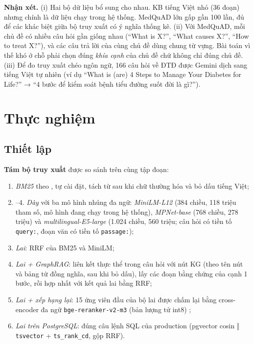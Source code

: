 
\textbf{Nhận xét.} (i) Hai bộ dữ liệu bổ sung cho nhau. KB tiếng Việt nhỏ (36 đoạn) nhưng chính là dữ liệu chạy trong hệ thống. MedQuAD lớn gấp gần 100 lần, đủ để các khác biệt giữa bộ truy xuất có ý nghĩa thống kê. (ii) Với MedQuAD, mỗi chủ đề có nhiều câu hỏi gần giống nhau (``What is X?'', ``What causes X?'', ``How to treat X?''), và các câu trả lời của cùng chủ đề dùng chung từ vựng. Bài toán vì thế khó ở chỗ phải chọn đúng \emph{khía cạnh} của chủ đề chứ không chỉ đúng chủ đề. (iii) Để đo truy xuất chéo ngôn ngữ, 166 câu hỏi về ĐTĐ được Gemini dịch sang tiếng Việt tự nhiên (ví dụ ``What is (are) 4 Steps to Manage Your Diabetes for Life?'' → ``4 bước để kiểm soát bệnh tiểu đường suốt đời là gì?'').

\section{Thực nghiệm}

\subsection{Thiết lập}

\textbf{Tám bộ truy xuất} được so sánh trên cùng tập đoạn:
\begin{enumerate}
  \item \emph{BM25} theo , tự cài đặt, tách từ sau khi chữ thường hóa và bỏ dấu tiếng Việt;
  \item–4. \emph{Dày} với ba mô hình nhúng đa ngữ: \emph{MiniLM-L12} (384 chiều, 118 triệu tham số, mô hình đang chạy trong hệ thống), \emph{MPNet-base} (768 chiều, 278 triệu) và \emph{multilingual-E5-large} \cite{wang2024e5} (1.024 chiều, 560 triệu; câu hỏi có tiền tố \texttt{query:}, đoạn văn có tiền tố \texttt{passage:});
  \setcounter{enumi}{4}
  \item \emph{Lai}: RRF  của BM25 và MiniLM;
  \item \emph{Lai + GraphRAG}: liên kết thực thể trong câu hỏi với nút KG (theo tên nút và bảng từ đồng nghĩa, sau khi bỏ dấu), lấy các đoạn bằng chứng của cạnh 1 bước, rồi hợp nhất với kết quả lai bằng RRF;
  \item \emph{Lai + xếp hạng lại}: 15 ứng viên đầu của bộ lai được chấm lại bằng cross-encoder đa ngữ \texttt{bge-reranker-v2-m3} (bản lượng tử int8) \cite{chen2024bge};
  \item \emph{Lai trên PostgreSQL}: đúng câu lệnh SQL của production (pgvector cosin ‖ \texttt{tsvector} + \texttt{ts\_rank\_cd}, gộp RRF).
\end{enumerate}

